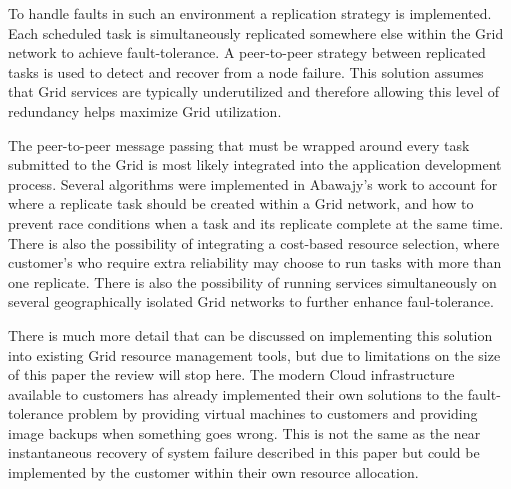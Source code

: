 \documentclass[conference]{IEEEtran}
\begin{document}
To handle faults in such an environment a replication strategy is implemented. Each scheduled task is simultaneously replicated somewhere else within the Grid network to achieve fault-tolerance. A peer-to-peer strategy between replicated tasks is used to detect and recover from a node failure. This solution assumes that Grid services are typically underutilized and therefore allowing this level of redundancy helps maximize Grid utilization. 

The peer-to-peer message passing that must be wrapped around every task submitted to the Grid is most likely integrated into the application development process. Several algorithms were implemented in Abawajy's work to account for where a replicate task should be created within a Grid network, and how to prevent race conditions when a task and its replicate complete at the same time. There is also the possibility of integrating a cost-based resource selection, where customer's who require extra reliability may choose to run tasks with more than one replicate. There is also the possibility of running services simultaneously on several geographically isolated Grid networks to further enhance faul-tolerance. 

There is much more detail that can be discussed on implementing this solution into existing Grid resource management tools, but due to limitations on the size of this paper the review will stop here. The modern Cloud infrastructure available to customers has already implemented their own solutions to the fault-tolerance problem by providing virtual machines to customers and providing image backups when something goes wrong. This is not the same as the near instantaneous recovery of system failure described in this paper but could be implemented by the customer within their own resource allocation. 
\end{document}

